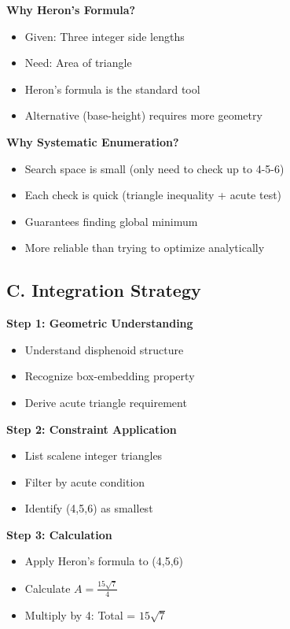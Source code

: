 \documentclass[12pt]{article}
\begin{document}
\begin{techniquesbox}
\textbf{Why Heron's Formula?}
\begin{itemize}
    \item Given: Three integer side lengths
    \item Need: Area of triangle
    \item Heron's formula is the standard tool
    \item Alternative (base-height) requires more geometry
\end{itemize}

\textbf{Why Systematic Enumeration?}
\begin{itemize}
    \item Search space is small (only need to check up to 4-5-6)
    \item Each check is quick (triangle inequality + acute test)
    \item Guarantees finding global minimum
    \item More reliable than trying to optimize analytically
\end{itemize}

\subsection*{C. Integration Strategy}

\textbf{Step 1: Geometric Understanding}
\begin{itemize}
    \item Understand disphenoid structure
    \item Recognize box-embedding property
    \item Derive acute triangle requirement
\end{itemize}

\textbf{Step 2: Constraint Application}
\begin{itemize}
    \item List scalene integer triangles
    \item Filter by acute condition
    \item Identify (4,5,6) as smallest
\end{itemize}

\textbf{Step 3: Calculation}
\begin{itemize}
    \item Apply Heron's formula to (4,5,6)
    \item Calculate $A = \frac{15\sqrt{7}}{4}$
    \item Multiply by 4: Total = $15\sqrt{7}$
\end{itemize}


\end{techniquesbox}
\end{document}
